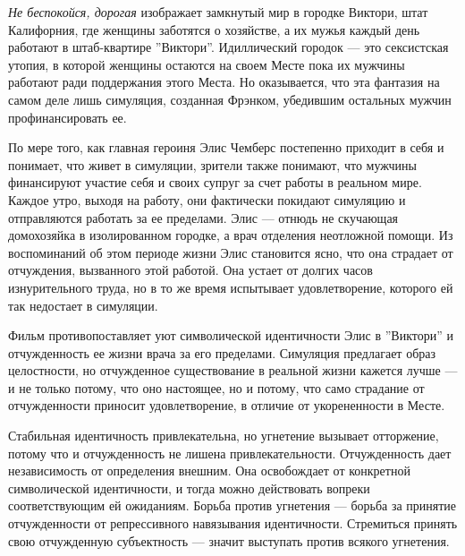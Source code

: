 \documentclass[12pt]{book}
\begin{document}
\textit{Не беспокойся, дорогая} изображает замкнутый мир в городке Виктори, штат Калифорния, где женщины заботятся о хозяйстве, а их мужья каждый день работают в штаб-квартире ''Виктори''. Идиллический городок --- это сексистская утопия, в которой женщины остаются на своем Месте пока их мужчины работают ради поддержания этого Места. Но оказывается, что эта фантазия на самом деле лишь симуляция, созданная Фрэнком, убедившим остальных мужчин профинансировать ее.

По мере того, как главная героиня Элис Чемберс постепенно приходит в себя и понимает, что живет в симуляции, зрители также понимают, что мужчины финансируют участие себя и своих супруг за счет работы в реальном мире. Каждое утро, выходя на работу, они фактически покидают симуляцию и отправляются работать за ее пределами. Элис --- отнюдь не скучающая домохозяйка в изолированном городке, а врач отделения неотложной помощи. Из воспоминаний об этом периоде жизни Элис становится ясно, что она страдает от отчуждения, вызванного этой работой. Она устает от долгих часов изнурительного труда, но в то же время испытывает удовлетворение, которого ей так недостает в симуляции.

Фильм противопоставляет уют символической идентичности Элис в ''Виктори'' и отчужденность ее жизни врача за его пределами. Симуляция предлагает образ целостности, но отчужденное существование в реальной жизни кажется лучше --- и не только потому, что оно настоящее, но и потому, что само страдание от отчужденности приносит удовлетворение, в отличие от укорененности в Месте.

Стабильная идентичность привлекательна, но угнетение вызывает отторжение, потому что и отчужденность не лишена привлекательности. Отчужденность дает независимость от определения внешним. Она освобождает от конкретной символической идентичности, и тогда можно действовать вопреки соответствующим ей ожиданиям. Борьба против угнетения --- борьба за принятие отчужденности от репрессивного навязывания идентичности. Стремиться принять свою отчужденную субъектность --- значит выступать против всякого угнетения.
\end{document}
